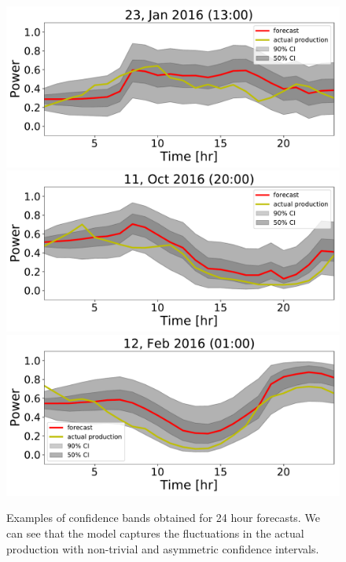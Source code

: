 \documentclass[ima, 25pt, portrait, plainboxedsections]{sciposter}
\begin{document}
\begin{multicols}{3}
\begin{figure}[t]
\begin{center}
   \includegraphics[width=1\linewidth]{confidence_intervals/24hr/31.pdf}
   \includegraphics[width=1\linewidth]{confidence_intervals/24hr/820.pdf}
   \includegraphics[width=1\linewidth]{confidence_intervals/24hr/82.pdf}

\end{center}
   \caption{ Examples of confidence bands obtained for 24 hour forecasts. We can see that the model captures the fluctuations in the actual production with non-trivial and asymmetric confidence intervals.}
\label{fig:72hr}
\end{figure}


\end{multicols}
\end{document}
